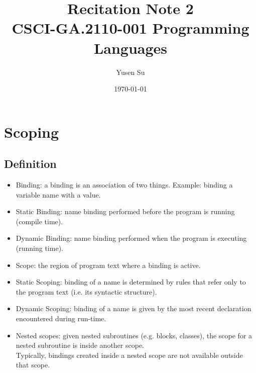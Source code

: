 \documentclass[11pt]{article}
\title{%
  Recitation Note 2 \\
  \large CSCI-GA.2110-001 Programming Languages}
\date{\today}
\author{Yusen Su}
\begin{document}
\maketitle
\section{Scoping}
\subsection{Definition}
\begin{itemize}
\item Binding: a binding is an association of two things. Example: binding a variable name with a value.
\item Static Binding: name binding performed before the program is running (compile time).
\item Dynamic Binding: name binding performed when the program is executing (running time).
\item Scope: the region of program text where a binding is active.
\item Static Scoping: binding of a name is determined by rules that refer only to the program text (i.e. its syntactic structure).
\item Dynamic Scoping: binding of a name is given by the most recent declaration encountered during run-time.
\item Nested scopes:  given nested subroutines (e.g. blocks, classes), the scope for a nested subroutine is inside another scope.  \\
Typically, bindings created inside a nested scope are not available outside that scope.

\end{itemize}
\end{document}
